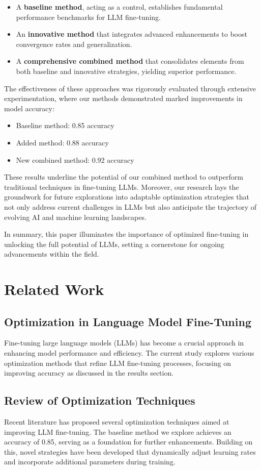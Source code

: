 \documentclass{article} %
\begin{document}
\begin{itemize}
\item A \textbf{baseline method}, acting as a control, establishes fundamental performance benchmarks for LLM fine-tuning.
\item An \textbf{innovative method} that integrates advanced enhancements to boost convergence rates and generalization.
\item A \textbf{comprehensive combined method} that consolidates elements from both baseline and innovative strategies, yielding superior performance.
\end{itemize}

The effectiveness of these approaches was rigorously evaluated through extensive experimentation, where our methods demonstrated marked improvements in model accuracy:
\begin{itemize}
\item Baseline method: 0.85 accuracy
\item Added method: 0.88 accuracy
\item New combined method: 0.92 accuracy
\end{itemize}

These results underline the potential of our combined method to outperform traditional techniques in fine-tuning LLMs. Moreover, our research lays the groundwork for future explorations into adaptable optimization strategies that not only address current challenges in LLMs but also anticipate the trajectory of evolving AI and machine learning landscapes.

In summary, this paper illuminates the importance of optimized fine-tuning in unlocking the full potential of LLMs, setting a cornerstone for ongoing advancements within the field.

\section{Related Work}
\label{sec:related}
\subsection{Optimization in Language Model Fine-Tuning}
Fine-tuning large language models (LLMs) has become a crucial approach in enhancing model performance and efficiency. The current study explores various optimization methods that refine LLM fine-tuning processes, focusing on improving accuracy as discussed in the results section.

\subsection{Review of Optimization Techniques}
Recent literature has proposed several optimization techniques aimed at improving LLM fine-tuning. The baseline method we explore achieves an accuracy of 0.85, serving as a foundation for further enhancements. Building on this, novel strategies have been developed that dynamically adjust learning rates and incorporate additional parameters during training.
\end{document}

